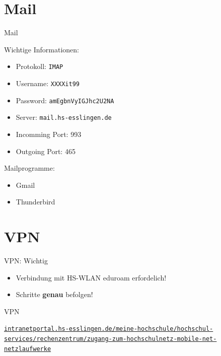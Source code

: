 \documentclass[10pt]{beamer}
\newcommand\urls[1]{%
  \href{https://#1}{\nolinkurl{#1}}%
}
\begin{document}
\section{Mail}

\begin{frame}{Mail}
    \begin{minipage} [t] {0.6\textwidth} 
        Wichtige Informationen:
        \begin{itemize}
            \item Protokoll: \texttt{IMAP}
            \item Username: \texttt{XXXXit99}
            \item Password: \texttt{amEgbnVyIGJhc2U2NA} %
            \item Server: \texttt{mail.hs-esslingen.de}
            \item Incomming Port: 993
            \item Outgoing Port: 465
        \end{itemize}
    \end{minipage}
    \begin{minipage} [t] {0.39\textwidth}
        Mailprogramme:
        \begin{itemize}
            \item Gmail \faMobile
            \item Thunderbird \faMobile~\faDesktop
        \end{itemize}
    \end{minipage}

    
\end{frame}

\section{VPN}

\begin{frame}{VPN: Wichtig}
    \Large
    \begin{itemize}
        \item[\faWarning] Verbindung mit HS-WLAN eduroam erfordelich!
        \item[\faWarning] Schritte \textbf{genau} befolgen!
    \end{itemize}
    

\end{frame}

\begin{frame}{VPN}
    \begin{figure}
        \centering
    \end{figure}
    \vspace{1em}

    \large
    \urls{intranetportal.hs-esslingen.de/meine-hochschule/hochschul-services/rechenzentrum/zugang-zum-hochschulnetz-mobile-net-netzlaufwerke}
\end{frame}
\end{document}
